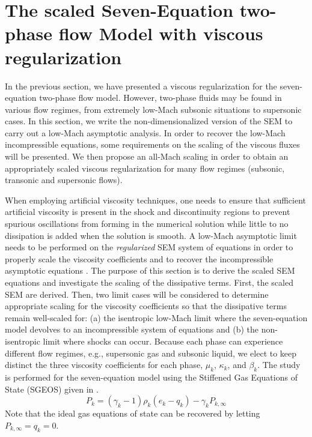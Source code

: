 \section{The scaled Seven-Equation two-phase flow Model with viscous regularization}\label{sec:low-Mach}
%
In the previous section, we have presented a viscous regularization for the seven-equation two-phase flow model.  However,
two-phase fluids may be found in various flow regimes, from extremely low-Mach subsonic situations to supersonic cases.
In this section, we write the non-dimensionalized version of the SEM to carry out a low-Mach asymptotic analysis. In order to 
recover the low-Mach incompressible equations, some requirements on the scaling of the viscous fluxes will be presented.  
We then propose an all-Mach scaling in order to obtain an appropriately scaled viscous regularization for many flow regimes
(subsonic, transonic and supersonic flows).

When employing artificial viscosity techniques, one needs to ensure that sufficient artificial viscosity is present in the shock 
and discontinuity regions to prevent spurious oscillations from forming in the numerical solution while little to no dissipation 
is added when the solution is smooth.
A low-Mach asymptotic limit needs to be performed on the {\it regularized} SEM system of equations in order to properly scale the viscosity 
coefficients and to recover the incompressible asymptotic equations \cite{LowMach1,LowMach2,LowMach3}. The purpose of this section is to 
derive the scaled SEM equations and investigate the scaling of the dissipative terms. 
First, the scaled SEM are derived. Then, two limit cases will be considered to determine 
appropriate scaling for the viscosity coefficients so that the dissipative terms remain well-scaled for: 
(a) the isentropic low-Mach limit where the seven-equation model devolves to an incompressible system of 
equations and (b) the non-isentropic limit where shocks can occur. 
Because each phase can experience different flow regimes, e.g., supersonic gas and subsonic liquid, we elect to keep distinct the three viscosity 
coefficients for each phase, $\mu_k$, $\kappa_k$, and $\beta_k$. The study is performed for the seven-equation model using the Stiffened Gas 
Equations of State (SGEOS) \cite{SGEOS} given in .
%
\begin{equation}\label{eq:SGEOS_bis}
P_k = \left( \gamma_k-1 \right) \rho_k( e_k-q_k) - \gamma_k P_{k,\infty}
\end{equation}
Note that the ideal gas equations of state can be recovered by letting $P_{k,\infty}=q_k=0$.

